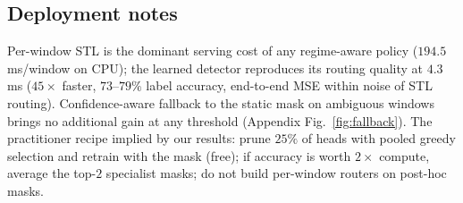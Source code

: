 \subsection{Deployment notes}
\label{sec:results-deploy}
Per-window STL is the dominant serving cost of any regime-aware policy
($194.5$\,ms/window on CPU); the learned detector reproduces its routing
quality at $4.3$\,ms ($45\times$ faster, $73$--$79\%$ label accuracy,
end-to-end MSE within noise of STL routing). Confidence-aware fallback
to the static mask on ambiguous windows brings no additional gain at any
threshold (Appendix Fig.~\ref{fig:fallback}). The practitioner recipe
implied by our results: prune $25\%$ of heads with pooled greedy
selection and retrain with the mask (free); if accuracy is worth
$2\times$ compute, average the top-$2$ specialist masks; do not build
per-window routers on post-hoc masks.
